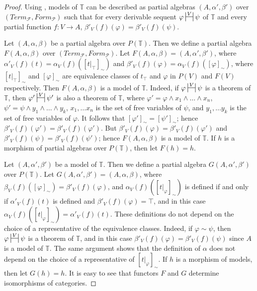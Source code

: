 \documentclass{elsarticle}
\theoremstyle{definition}
\theoremstyle{remark}
\numberwithin{figure}{section}
\begin{document}
\begin{proof}
Using , models of $\mathbb{T}$ can be described as partial algebras $(A,\alpha',\beta')$ over $(Term_\mathcal{F},Form_\mathcal{P})$
    such that for every derivable sequent $\varphi \ssststile{}{V} \psi$ of $\mathbb{T}$ and every partial function $f : V \to A$, $\beta'_V(f)(\varphi) = \beta'_V(f)(\psi)$.

Let $(A,\alpha,\beta)$ be a partial algebra over $P(\mathbb{T})$.
Then we define a partial algebra $F(A,\alpha,\beta)$ over $(Term_\mathcal{F},Form_\mathcal{P})$.
Let $F(A,\alpha,\beta) = (A,\alpha',\beta')$, where $\alpha'_V(f)(t) = \alpha_V(f)([t|_\top]_\sim)$ and $\beta'_V(f)(\varphi) = \alpha_V(f)([\varphi]_\sim)$,
    where $[t|_\top]_\sim$ and $[\varphi]_\sim$ are equivalence classes of $t_\top$ and $\varphi$ in $P(V)$ and $F(V)$ respectively.
Then $F(A,\alpha,\beta)$ is a model of $\mathbb{T}$.
Indeed, if $\varphi \ssststile{}{V} \psi$ is a theorem of $\mathbb{T}$, then $\varphi' \ssststile{}{V} \psi'$
    is also a theorem of $\mathbb{T}$, where $\varphi' = \varphi \land x_1 \land \ldots \land x_n$, $\psi' = \psi \land y_1 \land \ldots \land y_k$,
    $x_1, \ldots x_n$ is the set of free variables of $\psi$, and $y_1, \ldots y_k$ is the set of free variables of $\varphi$.
It follows that $[\varphi']_\sim = [\psi']_\sim$; hence $\beta'_V(f)(\varphi') = \beta'_V(f)(\varphi')$.
But $\beta'_V(f)(\varphi) = \beta'_V(f)(\varphi')$ and $\beta'_V(f)(\psi) = \beta'_V(f)(\psi')$; hence $F(A,\alpha,\beta)$ is a model of $\mathbb{T}$.
If $h$ is a morphism of partial algebras over $P(\mathbb{T})$, then let $F(h) = h$.

Let $(A,\alpha',\beta')$ be a model of $\mathbb{T}$.
Then we define a partial algebra $G(A,\alpha',\beta')$ over $P(\mathbb{T})$.
Let $G(A,\alpha',\beta') = (A,\alpha,\beta)$, where $\beta_V(f)([\varphi]_\sim) = \beta'_V(f)(\varphi)$, and $\alpha_V(f)([t|_\varphi]_\sim)$ is defined
    if and only if $\alpha'_V(f)(t)$ is defined and $\beta'_V(f)(\varphi) = \top$, and in this case $\alpha_V(f)([t|_\varphi]_\sim) = \alpha'_V(f)(t)$.
These definitions do not depend on the choice of a representative of the equivalence classes.
Indeed, if $\varphi \sim \psi$, then $\varphi \ssststile{}{V} \psi$ is a theorem of $\mathbb{T}$,
    and in this case $\beta'_V(f)(\varphi) = \beta'_V(f)(\psi)$ since $A$ is a model of $\mathbb{T}$.
The same argument shows that the definition of $\alpha$ does not depend on the choice of a representative of $[t|_\varphi]_\sim$.
If $h$ is a morphism of models, then let $G(h) = h$.
It is easy to see that functors $F$ and $G$ determine isomorphisms of categories.
\end{proof}
\end{document}
